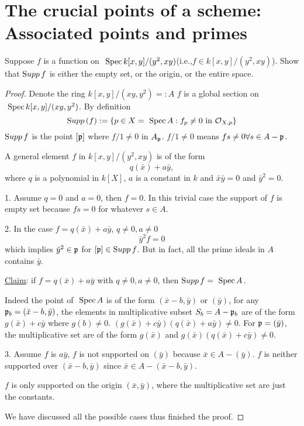 \section{The crucial points of a scheme: Associated points and primes}
\begin{exr}
Suppose $f$ is a function on $\text{ Spec\,} k[x,y]/(y^2,xy)$(i.e.,$f\in k[x,y]/(y^2,xy)$). Show that ${\text Supp\thinspace} f$ is either the empty set, or the origin, or the entire space.
\end{exr}
\begin{proof}Denote the ring $k[x,y]/(xy, y^2)=:A$
$f$ is a global section on $\text{ Spec\,} k[x,y]/(xy, y^2)$. By definition 
$$
{\text Supp\thinspace}(f):=\{p\in X=\text{ Spec\,} A:f_p\neq 0\text{ in } {\cal O}_{X,p}\}
$$
${\text Supp\thinspace} f$ is the point $[{\mathfrak p}]$ where $f/1\neq 0$ in $A_{\mathfrak p}$. $f/1\neq 0$ means $fs\neq 0\forall s\in A-{\mathfrak p}$. 

A general element $f$ in $k[x, y]/(y^2, xy)$ is of the form
$$
q(\bar{x})+a\bar{y},
$$
where $q$ is a polynomial in $k[X]$, $a$ is a constant in $k$ and $\bar{x}\bar{y}=0$ and $\bar{y}^2=0$. 

1. Assume $q=0$ and $a=0$, then $f=0$. In this trivial case the support of $f$ is empty set because $fs=0$ for whatever $s\in A$.

2. In the case $f=q(\bar{x})+a \bar{y}$, $q\neq 0,a\neq 0$ 
$$
\bar{y}^2f=0
$$
which implies $\bar{y}^2\in{\mathfrak p}$ for $[{\mathfrak p}]\in {\text Supp\thinspace} f$. But in fact, all the prime ideals in $A$  contains $\bar{y}$. 

\underline{Claim}: if $f=q(\bar{x})+a\bar{y}$ with $q\neq 0, a\neq 0$, then ${\text Supp\thinspace} f=\text{ Spec\,} A$.

Indeed the point of $\text{ Spec\,} A$ is of the form $(\bar{x}-b,\bar{y}) $ or $(\bar{y})$, for any ${\mathfrak p}_b=(\bar{x}-b,\bar{y})$, the elements in multiplicative subset $S_b=A-{\mathfrak p}_b$ are of  the form $g(\bar{x})+c\bar{y}$ where $g(b)\neq 0$. $(g(\bar{x})+c\bar{y})(q(\bar{x})+a\bar{y})\neq 0$. For ${\mathfrak p}=(\bar{y})$, the multiplicative set are of the form $g(\bar{x})$ and $g(\bar{x})(q(\bar{x})+c\bar{y})\neq 0$.

3. Assume $f$ is $a\bar{y}$, $f$ is not supported on $(\bar{y})$ because $\bar{x}\in A-(\bar{y})$. $f$ is neither supported over $(\bar{x}-b,\bar{y})$ since $\bar{x}\in A-(\bar{x}-b,\bar{y})$.

$f$ is only supported on the origin $(\bar{x},\bar{y})$, where the multiplicative set are just the constants.

We have discussed all the possible cases thus finished the proof.
\end{proof}

